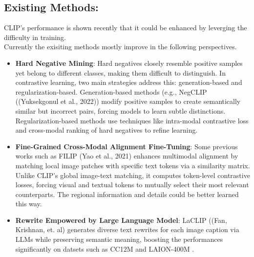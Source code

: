 \documentclass[11pt,letterpaper]{article}
\begin{document}
\subsection{Existing Methods:}
 CLIP's performance is shown recently that it could be enhanced by leverging the difficulty in training.\\
Currently the exisiting methods mostly improve in the following perspectives.\\
\begin{itemize}

    \item \textbf{Hard Negative Mining}: Hard negatives closely resemble positive samples yet belong to different classes, making them difficult to distinguish. In contrastive learning, two main strategies address this: generation-based and regularization-based. Generation-based methods (e.g., NegCLIP\cite{yuksekgonul2023visionlanguagemodelsbehavelike} ((Yuksekgonul et al., 2022)) modify positive samples to create semantically similar but incorrect pairs, forcing models to learn subtle distinctions. Regularization-based methods use techniques like intra-modal contrastive loss and cross-modal ranking of hard negatives to refine learning.

    
    
    \item \textbf{Fine-Grained Cross-Modal Alignment Fine-Tuning}: Some previous works such as FILIP\cite{yao2021filipfinegrainedinteractivelanguageimage} (Yao et al., 2021) enhances multimodal alignment by matching local image patches with specific text tokens via a similarity matrix. Unlike CLIP’s global image-text matching, it computes token-level contrastive losses, forcing visual and textual tokens to mutually select their most relevant counterparts. The regional information and details could be better learned this way.
    \item \textbf{Rewrite Empowered by Large Language Model}: LaCLIP\cite{fan2023improvingcliptraininglanguage} ((Fan, Krishnan, et. al) generates diverse text rewrites for each image caption via LLMs while preserving semantic meaning, boosting the performances significantly on datsets such as  CC12M and LAION-400M . 
\end{itemize}
\end{document}
